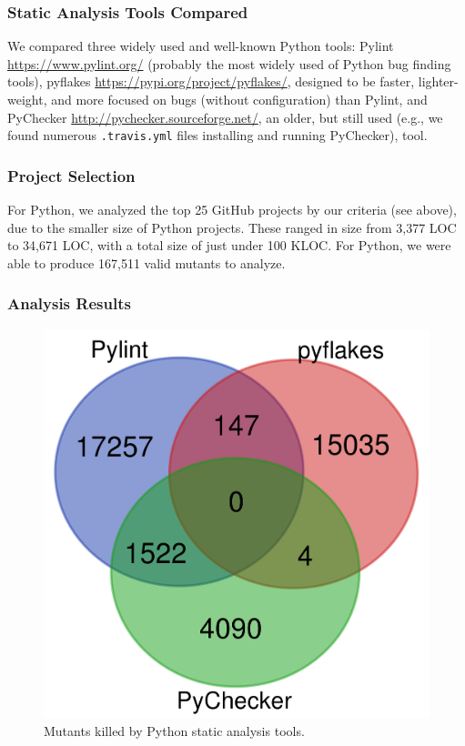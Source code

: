 \subsubsection{Static Analysis Tools Compared}

We compared three widely used and well-known Python tools:  Pylint \url{https://www.pylint.org/} (probably the most widely used of Python bug finding tools), pyflakes \url{https://pypi.org/project/pyflakes/}, designed to be faster, lighter-weight, and more focused on bugs (without configuration) than Pylint, and PyChecker \url{http://pychecker.sourceforge.net/}, an older, but still used (e.g., we found numerous {\tt .travis.yml} files installing and running PyChecker), tool.

\subsubsection{Project Selection}

For Python, we analyzed the top 25 GitHub projects by our criteria (see above), due to the smaller size of Python projects.  These ranged in size from 3,377 LOC to 34,671 LOC, with a total size of just under 100 KLOC.  For Python, we were able to produce 167,511 valid mutants to analyze.

\subsubsection{Analysis Results}


\begin{figure}
  \includegraphics[width=0.35\columnwidth]{python.png}
  \caption{Mutants killed by Python static analysis tools.}
  \label{fig:pythonvenn}
\end{figure}

